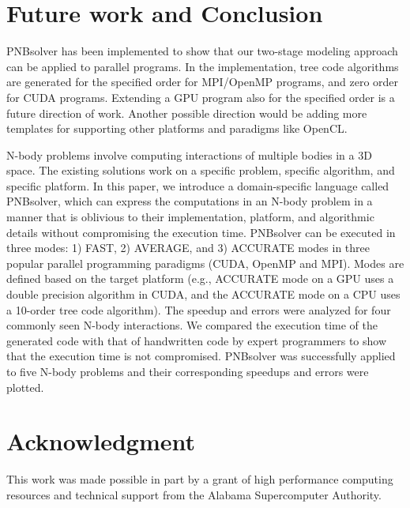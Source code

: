 \documentclass[draftclsnofoot]{elsarticle}
\begin{document}
\section{Future work and Conclusion}
\label{conclusion}

PNBsolver has been implemented to show that our two-stage modeling approach can be applied to parallel programs. In the implementation, tree code algorithms are generated
for the specified order for MPI/OpenMP programs, and zero order for CUDA programs. Extending a GPU program also for the specified order is a future direction of work.
Another possible direction would be adding more templates for supporting other platforms and paradigms like OpenCL.   


N-body problems involve computing interactions of multiple bodies in a 3D space. The existing solutions work on a specific problem, specific algorithm, and specific platform. 
In this paper, we introduce a domain-specific language called PNBsolver, which can express the computations in an N-body problem in a manner that is oblivious to their implementation, 
platform, and algorithmic details without compromising the execution time. PNBsolver can be executed in three modes: 1) FAST, 2) AVERAGE, and 3) ACCURATE modes in three popular 
parallel programming paradigms (CUDA, OpenMP and MPI). Modes are defined based on the target platform (e.g., ACCURATE mode on a GPU uses a double precision algorithm in CUDA, 
and the ACCURATE mode on a CPU uses a 10-order tree code algorithm). The speedup and errors were analyzed for four commonly seen N-body interactions. We compared
the execution time of the generated code with that of handwritten code by expert programmers to show that the execution time is not compromised. PNBsolver was successfully 
applied to five N-body problems and their corresponding speedups and errors were plotted.






\section*{Acknowledgment}
This work was made possible in part by a grant of high performance computing resources and technical support from the Alabama Supercomputer Authority.




\end{document}
